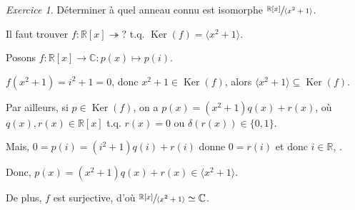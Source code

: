 \documentclass{report}
\theoremstyle{definition}
\theoremstyle{remark}
\newtheorem*{exer}{Exercice}
\def\RR{\mathbb{R}}
\def\CC{\mathbb{C}}
\def\noyau{\operatorname{Ker}}
\begin{document}
	\begin{exer}
		D\'eterminer \`a quel anneau connu est isomorphe $\sfrac{\RR[x]}{\langle x^2+1 \rangle}$.

		Il faut trouver $f:\RR[x] \twoheadrightarrow ?$ t.q. $\noyau(f)=\langle x^2+1 \rangle$.

		Posons $f:\RR[x]\to\CC:p(x)\mapsto p(i)$.

		$f(x^2+1) = i^2+1 = 0$, donc $x^2+1\in\noyau(f)$, alors $\langle x^2+1 \rangle\subseteq\noyau(f)$.

		Par ailleurs, si $p\in\noyau(f)$, on a $p(x)=(x^2+1)q(x)+r(x)$, o\`u $q(x),r(x)\in\RR[x]$ t.q. $r(x)=0$ ou $\delta(r(x))\in\{0,1\}$.

		Mais, $0=p(i)=(i^2+1)q(i)+r(i)$ donne $0=r(i)$ et donc $i\in\RR$, \lightning.

		Donc, $p(x)=(x^2+1)q(x)+r(x)\in\langle x^2+1 \rangle$.

		De plus, $f$ est surjective, d'o\`u $\sfrac{\RR[x]}{\langle x^2+1 \rangle} \simeq \CC$.
	\end{exer}
\end{document}
